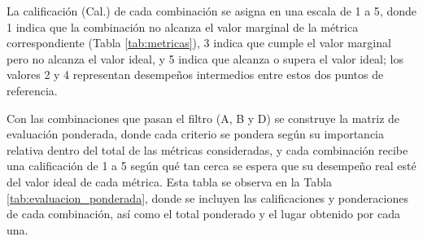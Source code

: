 La calificación (Cal.) de cada combinación se asigna en una escala de 1 a 5, donde 1 indica
que la combinación no alcanza el valor marginal de la métrica correspondiente (Tabla \ref{tab:metricas}),
3 indica que cumple el valor marginal pero no alcanza el valor ideal, y 5 indica que
alcanza o supera el valor ideal; los valores 2 y 4 representan desempeños intermedios entre
estos dos puntos de referencia.

Con las combinaciones que pasan el filtro (A, B y D) se construye la matriz de evaluación
ponderada, donde cada criterio se pondera según su importancia relativa dentro del total de
las métricas consideradas, y cada combinación recibe una calificación de 1 a 5 según qué tan
cerca se espera que su desempeño real esté del valor ideal de cada métrica. Esta tabla se
observa en la Tabla \ref{tab:evaluacion_ponderada}, donde se incluyen las calificaciones y ponderaciones de cada
combinación, así como el total ponderado y el lugar obtenido por cada una.

